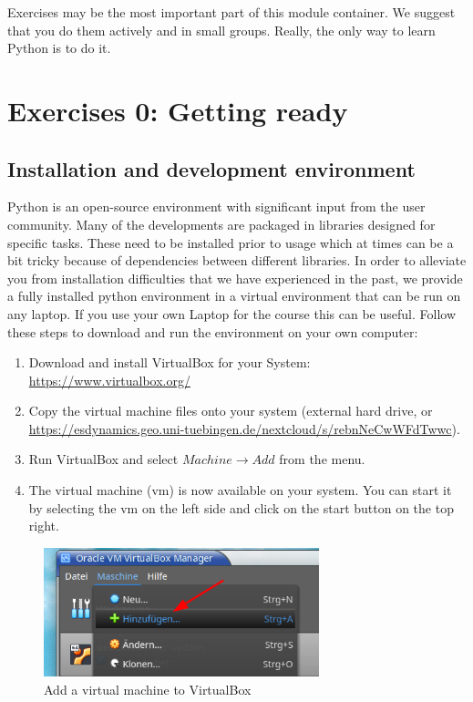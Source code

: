 \begin{tcolorbox}[enhanced jigsaw,breakable,pad at break*=1mm,
    colback=blue!5!white,colframe=babyblueeyes,title=Exercises]
    Exercises may be the most important part of this module container.
    We suggest that you do them actively and in small groups. Really, the only way to learn Python is to do it.      
\end{tcolorbox}
\section{Exercises 0: Getting ready}

\subsection{Installation and development environment}
Python is an open-source environment with significant input from the user community.
Many of the developments are packaged in libraries designed for specific tasks.
These need to be installed prior to usage which at times can be a bit tricky because of dependencies between
different libraries. In order to alleviate you from installation difficulties that we have experienced in
the past, we provide a fully installed python environment in a virtual environment that can be run on any laptop.
If you use your own Laptop for the course this can be useful. Follow these steps to download and run the environment on your own computer:\\

\begin{enumerate}
    \item Download and install VirtualBox for your System: \url{https://www.virtualbox.org/}
    \item Copy the virtual machine files onto your system (external hard drive, or \url{https://esdynamics.geo.uni-tuebingen.de/nextcloud/s/rebnNeCwWFdTwwc}).
    \item Run VirtualBox and select $Machine \rightarrow Add$ from the menu.
    \item The virtual machine (vm) is now available on your system. You can start it by selecting the vm on the left side and click on the start button on the top right.
\end{enumerate}

\begin{figure}[h!]
    \centering
    \includegraphics[width=8cm]{Figures/virtual_box1.png}
    \caption{Add a virtual machine to VirtualBox}
\end{figure}

